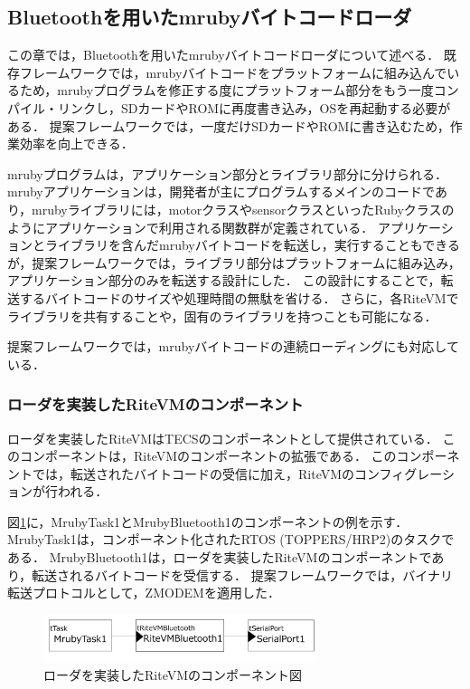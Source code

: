 \documentclass[submit,techrep]{ipsj}
\begin{document}
\subsection{Bluetoothを用いたmrubyバイトコードローダ}
\label{sec:mruby bytecode loader using Bluetooth}
この章では，Bluetoothを用いたmrubyバイトコードローダについて述べる．
既存フレームワークでは，mrubyバイトコードをプラットフォームに組み込んでいるため，mrubyプログラムを修正する度にプラットフォーム部分をもう一度コンパイル・リンクし，SDカードやROMに再度書き込み，OSを再起動する必要がある．
提案フレームワークでは，一度だけSDカードやROMに書き込むため，作業効率を向上できる．

mrubyプログラムは，アプリケーション部分とライブラリ部分に分けられる．
mrubyアプリケーションは，開発者が主にプログラムするメインのコードであり，mrubyライブラリには，motorクラスやsensorクラスといったRubyクラスのようにアプリケーションで利用される関数群が定義されている．
アプリケーションとライブラリを含んだmrubyバイトコードを転送し，実行することもできるが，提案フレームワークでは，ライブラリ部分はプラットフォームに組み込み，アプリケーション部分のみを転送する設計にした．
この設計にすることで，転送するバイトコードのサイズや処理時間の無駄を省ける．
さらに，各RiteVMでライブラリを共有することや，固有のライブラリを持つことも可能になる．

提案フレームワークでは，mrubyバイトコードの連続ローディングにも対応している．

\subsubsection{ローダを実装したRiteVMのコンポーネント}
ローダを実装したRiteVMはTECSのコンポーネントとして提供されている．
このコンポーネントは，RiteVMのコンポーネント\cite{par:mrubyonTECS}の拡張である．
このコンポーネントでは，転送されたバイトコードの受信に加え，RiteVMのコンフィグレーションが行われる．

図\ref{fig:component_bluetooth}に，MrubyTask1とMrubyBluetooth1のコンポーネントの例を示す．
MrubyTask1は，コンポーネント化されたRTOS (TOPPERS/HRP2\cite{par:hr-tecs})のタスクである．
MrubyBluetooth1は，ローダを実装したRiteVMのコンポーネントであり，転送されるバイトコードを受信する．
提案フレームワークでは，バイナリ転送プロトコルとして，ZMODEMを適用した．

\begin{figure}[t]
    \centering
    \includegraphics[width=8cm,clip]{../EMSOFT2016/figure/component_bluetooth.pdf}
    \caption{ローダを実装したRiteVMのコンポーネント図}
\vspace{-2mm}
    \label{fig:component_bluetooth}
\end{figure}
\end{document}
